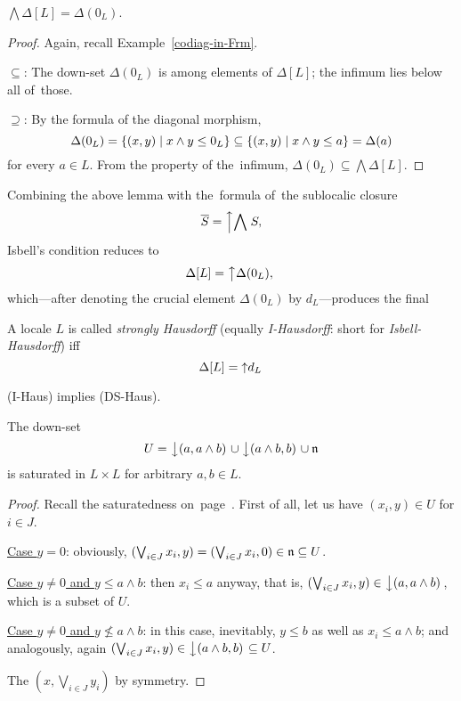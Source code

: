 \begin{lem}
  $\bigwedge \Delta[L] = \Delta(0_L)$.
\end{lem}

\begin{proof}
  Again, recall Example~\ref{codiag-in-Frm}\thinspace.

  $\subseteq$: The down-set $\Delta(0_L)$ is among elements of $\Delta[L]$; the
  infimum lies below all of~those.

  $\supseteq$: By the formula of the diagonal morphism,
  \[
    \Delta(0_L)
    = \left\{(x, y) \mid x \wedge y \leq 0_L \right\}
    \subseteq \left\{(x, y) \mid x \wedge y \leq a \right\}
    = \Delta(a)
  \]
  for every $a\in L$.
  From the property of the~infimum, $\Delta(0_L) \subseteq \bigwedge
  \Delta[L]$.
\end{proof}

Combining the above lemma with the~formula of~the sublocalic closure
\[
  \overline{S} = \left\uparrow \bigwedge \right. S,
\]
Isbell's condition reduces to
\[
  \Delta[L] = \left\uparrow \Delta(0_L),\right.
\]
which---after denoting the crucial element $\Delta(0_L)$ by $d_L$---produces
the final

\begin{framed}
  \begin{df}[I-Haus]
    A locale $L$ is called \emph{strongly Hausdorff\/} (equally
    \emph{I-Hausdorff}: short for \emph{Isbell-Hausdorff}) iff
    \[
      \Delta[L] = \left\uparrow d_L \right.
    \]
  \end{df}
\end{framed}

\begin{thm} \label{IHaus->DSHaus}
  (I-Haus) implies (DS-Haus).
\end{thm}

\begin{lem} \label{downsets-satur}
  The down-set
  \[
    U = \left\downarrow(a, a \wedge b)\right. \cup \left\downarrow(a \wedge b, b)\right. \cup \mathfrak{n}
  \]
  is saturated in $L \times L$ for arbitrary $a, b\in L$.
\end{lem}
\begin{proof}
  Recall the saturatedness on~page~\pageref{df:satur}\thinspace.
  First of all, let us have $(x_i, y)\in U$ for $i\in J$.

  \underline{Case $y = 0$}:
  obviously, $(\bigvee_{i\in J} x_i, y) = (\bigvee_{i\in J} x_i, 0)\in \mathfrak{n}
  \subseteq U$.

  \underline{Case $y \ne 0$ and $y \leq a \wedge b$}:
  then $x_i \leq a$ anyway, that is, $(\bigvee_{i\in J} x_i, y) \in
  \left\downarrow(a, a \wedge b)\right.$, which is a subset of $U$.

  \underline{Case $y \ne 0$ and $y \not\leq a \wedge b$}:
  in this case, inevitably, $y \leq b$ as well as $x_i \leq a \wedge b$; and
  analogously, again $(\bigvee_{i\in J} x_i, y) \in \left\downarrow(a \wedge b,
  b)\right. \subseteq U$.

  The $(x, \bigvee_{i\in J} y_i)$ by symmetry.
\end{proof}

